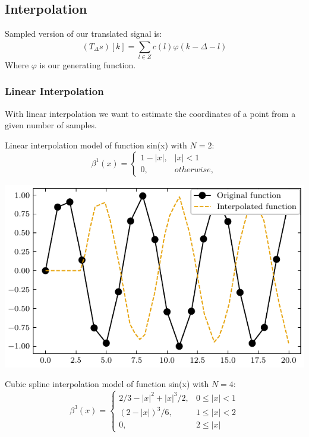 \documentclass[]{usiinfbachelorproject}
\begin{document}
	
	\iffalse
	
	\subsection{Interpolation}
	Sampled version of our translated signal is:
	\begin{equation}
		(T_\Delta s)[k] = \sum_{l \in Z}^{} c(l)\varphi(k - \Delta - l)
	\end{equation}
	Where $\varphi$ is our generating function.
	\subsubsection{Linear Interpolation}
	With linear interpolation we want to estimate the coordinates of a point from a given number of samples. 
	
	Linear interpolation model of function sin(x) with $N = 2$:
	\begin{equation}
		\beta^1(x) = 
		\begin{cases}
			1 - |x|, & |x| < 1    \\
			0,       & otherwise, 
		\end{cases}
	\end{equation}
	\begin{center}
		\includegraphics{"images/linear_interpolation_example.pdf"}
	\end{center}
	
	Cubic spline interpolation model of function sin(x) with $N=4$:
	\begin{equation}
		\beta^3(x) = 
		\begin{cases}
			2/3 - |x|^2 + |x|^3/2, & 0 \leq|x| < 1  \\
			(2-|x|)^3/6,           & 1 \leq |x| < 2 \\
			0,                     & 2 \leq |x|     
		\end{cases}
	\end{equation} \cite{main_article}
	
\end{document}
